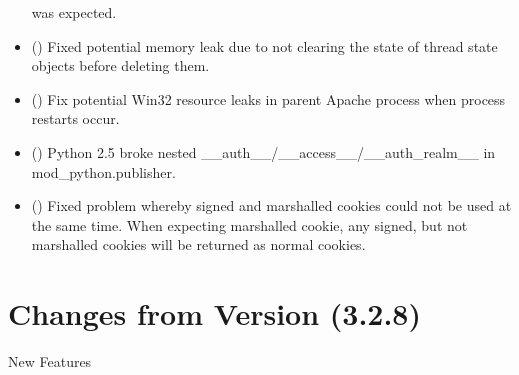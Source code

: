 \begin{itemize}
      was expected.
    \item
      ()
      Fixed potential memory leak due to not clearing the state of thread state
      objects before deleting them.
    \item
      ()
      Fix potential Win32 resource leaks in parent Apache process when process
      restarts occur.
    \item
      ()
      Python 2.5 broke nested __auth__/__access__/__auth_realm__ in
      mod_python.publisher.
    \item
      ()
      Fixed problem whereby signed and marshalled cookies could not be used
      at the same time. When expecting marshalled cookie, any signed, but
      not marshalled cookies will be returned as normal cookies.
  \end{itemize}


\chapter{Changes from Version (3.2.8)\label{app-changes}}


  New Features

